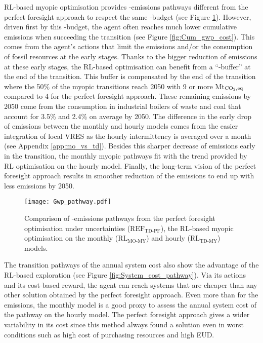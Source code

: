 \gls{RL}-based myopic optimisation provides -emissions pathways different from the perfect foresight approach to respect the same -budget (see Figure \ref{fig:Gwp_pathway}). However, driven first by this -budget, the agent often reaches much lower cumulative emissions when succeeding the transition (see Figure \ref{fig:Cum_gwp_cost}). This comes from the agent's actions that limit the emissions and/or the consumption of fossil resources at the early stages. Thanks to the bigger reduction of emissions at these early stages, the \gls{RL}-based optimisation can benefit from a ``-buffer'' at the end of the transition. This buffer is compensated by the end of the transition where the 50\% of the myopic transitions reach 2050 with 9 or more Mt$_{\ce{CO2},\text{eq}}$ compared to 4 for the perfect foresight approach. These remaining emissions by 2050 come from the consumption in industrial boilers of waste and coal that account for 3.5\% and 2.4\% on average by 2050. The difference in the early drop of emissions between the monthly and hourly models comes from the easier integration of local \gls{VRES} as the hourly intermittency is averaged over a month (see Appendix \ref{app:mo_vs_td}). Besides this sharper decrease of emissions early in the transition, the monthly myopic pathways fit with the trend provided by \gls{RL} optimisation on the hourly model. Finally, the long-term vision of the perfect foresight approach results in smoother reduction of the emissions to end up with less emissions by 2050.

\begin{figure}[!htbp]
\centering
\texttt{[image: Gwp\_pathway.pdf]}
\caption{Comparison of -emissions pathways from the perfect foresight optimisation under uncertainties ($\text{REF}_{\text{TD-PF}}$), the \gls{RL}-based myopic optimisation on the monthly ($\text{RL}_{\text{MO-MY}}$) and hourly ($\text{RL}_{\text{TD-MY}}$) models.}
\label{fig:Gwp_pathway}
\end{figure}

The transition pathways of the annual system cost also show the advantage of the \gls{RL}-based exploration (see Figure \ref{fig:System_cost_pathway}). Via its actions and its cost-based reward, the agent can reach systems that are cheaper than any other solution obtained by the perfect foresight approach. Even more than for the emissions, the monthly model is a good proxy to assess the annual system cost of the pathway on the hourly model. The perfect foresight approach gives a wider variability in its cost since this method always found a solution even in worst conditions such as high cost of purchasing resources and high \gls{EUD}. 

